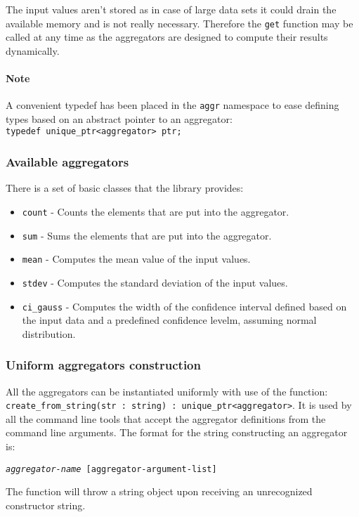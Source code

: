 \documentclass{report}
\begin{document}
The input values aren't stored as in case of large data sets it could drain the
available memory and is not really necessary. Therefore the \texttt{get}
function may be called at any time as the aggregators are designed to compute
their results dynamically. 

\paragraph{Note}
A convenient typedef has been placed in the \texttt{aggr} namespace to ease
defining types based on an abstract pointer to an aggregator:\\
\texttt{typedef unique\_ptr<aggregator> ptr;}

\subsubsection{Available aggregators}
There is a set of basic classes that the library provides:

\begin{itemize}
	\item \texttt{count} - Counts the elements that are put into the aggregator.
	\item \texttt{sum} - Sums the elements that are put into the aggregator.
	\item \texttt{mean} - Computes the mean value of the input values.
	\item \texttt{stdev} - Computes the standard deviation of the input values.
	\item \texttt{ci\_gauss} - Computes the width of the confidence
		interval defined based on the input data and a predefined
		confidence levelm, assuming normal distribution.
\end{itemize}

\subsubsection{Uniform aggregators construction}
All the aggregators can be instantiated uniformly with use of the function:
\texttt{create\_from\_string(str : string) : unique\_ptr<aggregator>}.
It is used by all the command line tools that accept the aggregator definitions
from the command line arguments. The format for the string constructing an
aggregator is:
\begin{center}
	\texttt{\textit{aggregator-name} [\texttt{aggregator-argument-list}]}
\end{center}
The function will throw a string object upon receiving an unrecognized constructor
string.
\end{document}
